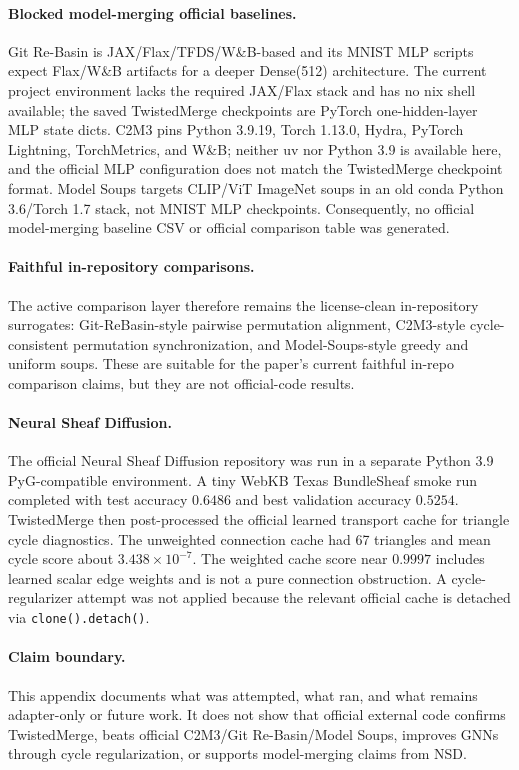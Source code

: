 \paragraph{Blocked model-merging official baselines.}
Git Re-Basin is JAX/Flax/TFDS/W\&B-based and its MNIST MLP scripts expect
Flax/W\&B artifacts for a deeper Dense(512) architecture.  The current project
environment lacks the required JAX/Flax stack and has no nix shell available;
the saved TwistedMerge checkpoints are PyTorch one-hidden-layer MLP state
dicts.  C2M3 pins Python 3.9.19, Torch 1.13.0, Hydra, PyTorch Lightning,
TorchMetrics, and W\&B; neither uv nor Python 3.9 is available here, and the
official MLP configuration does not match the TwistedMerge checkpoint format.
Model Soups targets CLIP/ViT ImageNet soups in an old conda Python 3.6/Torch
1.7 stack, not MNIST MLP checkpoints.  Consequently, no official model-merging
baseline CSV or official comparison table was generated.

\paragraph{Faithful in-repository comparisons.}
The active comparison layer therefore remains the license-clean in-repository
surrogates: Git-ReBasin-style pairwise permutation alignment, C2M3-style
cycle-consistent permutation synchronization, and Model-Soups-style greedy and
uniform soups.  These are suitable for the paper's current faithful in-repo
comparison claims, but they are not official-code results.

\paragraph{Neural Sheaf Diffusion.}
The official Neural Sheaf Diffusion repository was run in a separate Python 3.9
PyG-compatible environment.  A tiny WebKB Texas BundleSheaf smoke run completed
with test accuracy \(0.6486\) and best validation accuracy \(0.5254\).
TwistedMerge then post-processed the official learned transport cache for
triangle cycle diagnostics.  The unweighted connection cache had 67 triangles
and mean cycle score about \(3.438\times 10^{-7}\).  The weighted cache score
near \(0.9997\) includes learned scalar edge weights and is not a pure
connection obstruction.  A cycle-regularizer attempt was not applied because
the relevant official cache is detached via \texttt{clone().detach()}.

\paragraph{Claim boundary.}
This appendix documents what was attempted, what ran, and what remains
adapter-only or future work.  It does not show that official external code
confirms TwistedMerge, beats official C2M3/Git Re-Basin/Model Soups, improves
GNNs through cycle regularization, or supports model-merging claims from NSD.

